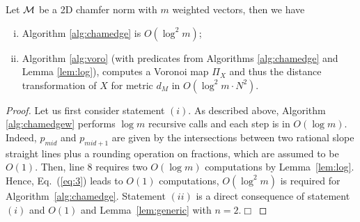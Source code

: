 \documentclass{llncs}
\begin{document}
\begin{theorem}
\label{them}
  Let $\mathcal{M}$ be a 2D chamfer norm with $m$ weighted vectors, then we
  have
  \begin{enumerate}[(i)]
  \item Algorithm     \ref{alg:chamedge} is   $O(\log^2{m})$\;;
  \item Algorithm \ref{alg:voro} (with predicates from Algorithms
    \ref{alg:chamedge} and Lemma \ref{lem:log}), computes a Voronoi
    map $\Pi_X$ and thus the distance transformation of $X$ for metric
    $d_{M}$ in   $ O( \log^2{m}\cdot N^2)$.
  \end{enumerate}
\end{theorem}
\begin{proof}
Let us first consider statement $(i)$. As described above, Algorithm
\ref{alg:chamedgew} performs $\log{m}$ recursive calls and each step
is in $O(\log{m})$. Indeed, $p_{mid}$ and $p_{mid+1}$ are given by the
intersections between two rational slope straight lines plus a
rounding operation on fractions, which are assumed to be $O(1)$. Then,
line 8 requires two $O(\log{m})$ computations by
Lemma~\ref{lem:log}. Hence, Eq.~(\ref{eq:3}) leads to $O(1)$
computations, $O(\log^2{m})$ is required for
Algorithm~\ref{alg:chamedge}.
Statement $(ii)$ is a direct consequence of statement $(i)$ and
$O(1)$ and Lemma~\ref{lem:generic} with $n=2$.$\Box$
\end{proof}


\end{document}
